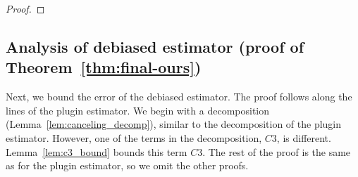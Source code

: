 \begin{proof}







\end{proof}

\subsection{Analysis of debiased estimator (proof of Theorem~\ref{thm:final-ours})}

Next, we bound the error of the debiased estimator. The proof follows along the lines of the plugin estimator. We begin with a decomposition (Lemma~\ref{lem:canceling_decomp}), similar to the decomposition of the plugin estimator. However, one of the terms in the decomposition, $C3$, is different. Lemma~\ref{lem:c3_bound} bounds this term $C3$. The rest of the proof is the same as for the plugin estimator, so we omit the other proofs.

